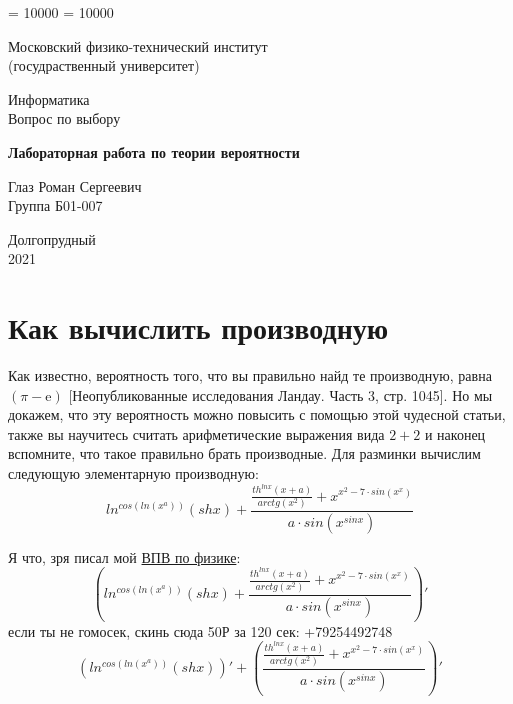 \documentclass[a4paper, 12pt]{article}
\begin{document}
\binoppenalty = 10000
\relpenalty = 10000

\begin{titlepage}
\newpage

\begin{center}
\normalsize Московский физико-технический институт \\(госудраственный университет)
\end{center}
\vspace{6em}
\begin{center}
\Large Информатика\\Вопрос по выбору
\end{center}
\vspace{1em}
\begin{center}
	\large \textbf{Лабораторная работа по теории вероятности}
\end{center}
\vspace{2em}
\begin{center}
	\large Глаз Роман Сергеевич\\Группа Б01-007
\end{center}
\vspace{\fill}
\begin{center}
	Долгопрудный \\2021
\end{center}
\end{titlepage}

\tableofcontents
\newpage

\section{Как вычислить производную}
Как известно, вероятность того, что вы правильно найд те производную, равна $(\pi - \text{e})$ [Неопубликованные исследования Ландау. Часть 3, стр. 1045]. Но мы докажем, что эту вероятность можно повысить с помощью этой чудесной статьи, также вы научитесь считать арифметические выражения вида $2+2$ и наконец вспомните, что такое правильно брать производные.
Для разминки вычислим следующую элементарную производную:
\begin{equation}
	ln^{cos\left(ln\left(x^{a}\right)\right)}\left(shx\right) + \frac{\frac{th^{lnx}\left(x + a\right)}{arctg\left(x^{2}\right)} + x^{x^{2} - 7 \cdot sin\left(x^{x}\right)}}{a \cdot sin\left(x^{sinx}\right)}
\end{equation}

Я что, зря писал мой \href{https://drive.google.com/drive/folders/1cQOob8lLqhboZnilkguOm7CtLHlbPb1G?usp=sharing}{ВПВ по физике}:
\begin{equation}
\left(ln^{cos\left(ln\left(x^{a}\right)\right)}\left(shx\right) + \frac{\frac{th^{lnx}\left(x + a\right)}{arctg\left(x^{2}\right)} + x^{x^{2} - 7 \cdot sin\left(x^{x}\right)}}{a \cdot sin\left(x^{sinx}\right)} \right)'
\end{equation}
если ты не гомосек, скинь сюда 50Р за 120 сек: +79254492748
\begin{equation}
\left( ln^{cos\left(ln\left(x^{a}\right)\right)}\left(shx\right) \right) ' + \left( \frac{\frac{th^{lnx}\left(x + a\right)}{arctg\left(x^{2}\right)} + x^{x^{2} - 7 \cdot sin\left(x^{x}\right)}}{a \cdot sin\left(x^{sinx}\right)} \right)'
\end{equation}
\end{document}
